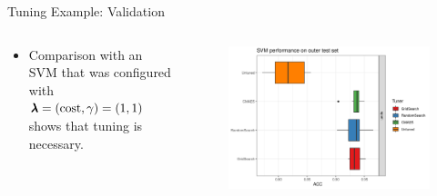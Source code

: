 \begin{frame}{Tuning Example: Validation}

\begin{columns}
\begin{column}{0.4\textwidth}
  \footnotesize

  \begin{itemize}
    \item Comparison with an SVM that was configured with $\pmb{\lambda} = (\text{cost},\gamma) = (1,1)$ shows that tuning is necessary.
  \end{itemize}
\end{column}
\begin{column}{0.6\textwidth}
  \begin{figure}
  \includegraphics[width=\textwidth]{images/benchmark_boxplot_default.png}
  \end{figure}
\end{column}
\end{columns}
\end{frame}

